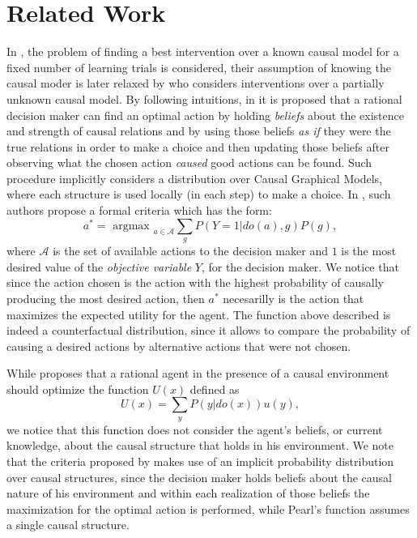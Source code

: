 \documentclass[letterpaper]{article}
\begin{document}
\section{Related Work}
In \cite{lattimoreNIPS2016}, the problem of finding a best intervention over a known causal model for a fixed number of learning trials is considered, their assumption of knowing the causal moder is later relaxed by \cite{sen2017identifying} who considers interventions over a partially unknown causal model. By following \cite{joyce1999foundations} intuitions, in \cite{gonzalez2018playing} it is proposed that a rational decision maker can find an optimal action by holding \textit{beliefs} about the existence and strength of causal relations and by using those beliefs \textit{as if} they were the true relations in order to make a choice and then updating those beliefs after observing what the chosen action \textit{caused} good actions can be found. Such procedure implicitly considers a distribution over Causal Graphical Models, where each structure is used locally (in each step) to make a choice. In \cite{2019arXiv190202279G}, such authors propose a formal criteria which has the form:
\[  a^\ast = \textrm{ argmax }_{a \in \mathcal{A}}\sum_g P(Y=1 | do(a), g)P(g), \]
where $\mathcal{A}$ is the set of available actions to the decision maker and $1$ is the most desired value of the \textit{objective variable} $Y$, for the decision maker. We notice that since the action chosen is the action with the highest probability of causally producing the most desired action, then $a^\ast$ necesarilly is the action that maximizes the expected utility for the agent. The function above described is indeed a counterfactual distribution, since it allows to compare the probability of causing a desired actions by alternative actions that were not chosen.

While \cite{pearl2009causality} proposes that a rational agent in the presence of a causal environment should optimize the function $U(x)$ defined as 
\[ U(x)=\sum_y P(y | do(x)) u(y), \]
we notice that this function does not consider the agent's beliefs, or current knowledge, about the causal structure that holds in his environment. We note that the criteria proposed by \cite{2019arXiv190202279G} makes use of an implicit probability distribution over causal structures, since the decision maker holds beliefs about the causal nature of his environment and within each realization of those beliefs the maximization for the optimal action is performed, while Pearl's function assumes a single causal structure.
\end{document}

